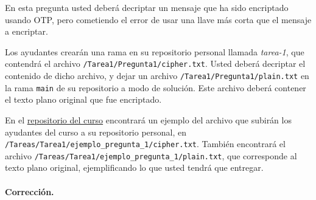 
En esta pregunta usted deberá decriptar un mensaje que ha sido encriptado usando OTP, pero cometiendo el error de usar una llave más corta que el mensaje a encriptar.

Los ayudantes crearán una rama en su repositorio personal llamada \emph{tarea-1}, que contendrá el archivo \texttt{/Tarea1/Pregunta1/cipher.txt}. Usted deberá decriptar el contenido de dicho archivo, y dejar un archivo \texttt{/Tarea1/Pregunta1/plain.txt} en la rama \texttt{main} de su repositorio a modo de solución. Este archivo deberá contener el texto plano original que fue encriptado. 

En el \href{https://github.com/IIC3253/2025}{repositorio del curso} encontrará un ejemplo del archivo que subirán los ayudantes del curso a su repositorio personal, en \texttt{/Tareas/Tarea1/ejemplo\_pregunta\_1/cipher.txt}. También encontrará el archivo \texttt{/Tareas/Tarea1/ejemplo\_pregunta\_1/plain.txt}, que corresponde al texto plano original, ejemplificando lo que usted tendrá que entregar.

\medskip

\paragraph{Corrección.}

